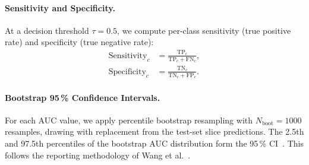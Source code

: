 \paragraph{Sensitivity and Specificity.}
At a decision threshold $\tau = 0.5$, we compute per-class sensitivity
(true positive rate) and specificity (true negative rate):
\begin{align}
    \mathrm{Sensitivity}_c &= \frac{\mathrm{TP}_c}{\mathrm{TP}_c + \mathrm{FN}_c}, \nonumber \\
    \mathrm{Specificity}_c &= \frac{\mathrm{TN}_c}{\mathrm{TN}_c + \mathrm{FP}_c}.
    \label{eq:sens_spec}
\end{align}

\paragraph{Bootstrap 95\,\% Confidence Intervals.}
For each AUC value, we apply percentile bootstrap resampling with
$N_{\mathrm{boot}} = 1000$ resamples, drawing with replacement from the
test-set slice predictions.
The 2.5th and 97.5th percentiles of the bootstrap AUC distribution form
the 95\,\% CI~\cite{efron1994introduction}.
This follows the reporting methodology of Wang et al.~\cite{wang2021deeplearning}.
